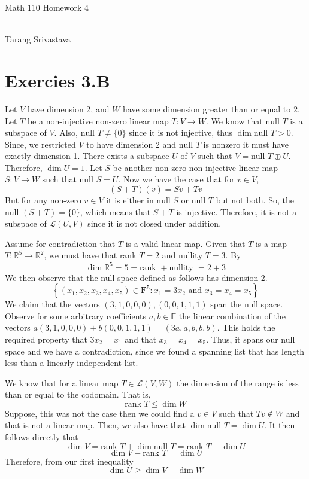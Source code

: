 \documentclass[10pt, twocolumn]{article}
\author{Tarang Srivastava}
\newcommand{\R}{\mathbb{R}}
\newcommand{\F}{\mathbb{F}}
\newcommand{\LinearMap}[2]{\mathcal{L}(#1, #2)}
\newcommand{\nul}{\text{null }}
\newcommand{\nullity}{\text{nullity }}
\newcommand{\rank}{\text{rank }}
\newcommand{\makechaptertitle}[1]{
\begin{center}
	\begin{large}
		#1
	\end{large}
	\begin{small}
		\\Tarang Srivastava
	\end{small}
\end{center}
}
\begin{document}
	
\makechaptertitle{Math 110 Homework 4}

\section{Exercies 3.B}
\begin{q}[7]
    Let $ V $ have dimension 2, and $ W $ have some dimension greater than or equal to 2. 
    Let $ T $ be a non-injective non-zero linear map $ T: V \to W $. 
    We know that $ \nul T $ is a subspace of $ V $. 
    Also, $ \nul T \neq \{0\} $ since it is not injective, 
    thus $ \dim \nul T > 0 $. 
    Since, we restricted $ V $ to have dimension 2 and $ \nul T $ is nonzero it must have exactly dimension 1. 
    There exists a subspace $ U $ of $ V $ such that $ V = \nul T \oplus U $. 
    Therefore, $ \dim U = 1 $.
    Let $ S $ be another  non-zero non-injective linear map $ S : V \to W $ such that $ \nul S = U $. 
    Now we have the case that for $ v \in V $, 
    $$ (S + T)(v) = Sv + Tv $$
    But for any non-zero $ v \in V $ it is either in $ \nul S $ or $ \nul T $ but not both. 
    So, the $ \nul (S + T) = \{0\} $, which means that $ S + T $ is injective. 
    Therefore, it is not a subspace of $ \LinearMap{U}{V} $ since it is not closed under addition.
\end{q}

\begin{q}[15]
    Assume for contradiction that $ T $ is a valid linear map. 
    Given that $ T $ is a map $ T: \R^5 \to \R^2$, we must have that $ \rank T = 2 $ and $ \nullity T = 3 $. 
    By 
    $$ \dim \R^5 = 5 = \rank + \nullity = 2 + 3 $$
    We then observe that the null space defined as follows
    has dimension 2. 
    $$\left\{\left(x_{1}, x_{2}, x_{3}, x_{4}, x_{5}\right) \in \mathbf{F}^{5}: x_{1}=3 x_{2} \text { and } x_{3}=x_{4}=x_{5}\right\}$$
    We claim that the vectors $ (3, 1, 0, 0, 0), (0, 0, 1, 1, 1) $ span the null space. 
    Observe for some arbitrary coefficients $ a, b \in \F $ the linear combination of the vectors 
    $ a(3, 1, 0, 0, 0) + b(0, 0, 1, 1, 1) = (3a, a, b, b, b)$. 
    This holds the required property that $ 3x_2 = x_1 $ and that $ x_3 = x_4 = x_5 $. 
    Thus, it spans our null space and we have a contradiction, since we found a spanning list that has length less than a linearly independent list.  
\end{q}

\begin{q}[19]
    We know that for a linear map $ T \in \LinearMap{V}{W} $ the dimension of the range is less than or equal to the codomain.
    That is, 
    $$ \rank T \leq \dim W $$
    Suppose, this was not the case then we could find a $ v \in V $ such that $ Tv \not \in W $ and that is not a linear map. 
    Then, we also have that $ \dim \nul T = \dim U $. 
    It then follows directly that 
    $$ \dim V = \rank T + \dim \nul T = \rank T + \dim U $$
    $$ \dim V - \rank T = \dim U $$
    Therefore, from our first inequality 
    $$ \dim U \geq \dim V - \dim W $$
\end{q}
\end{document}
